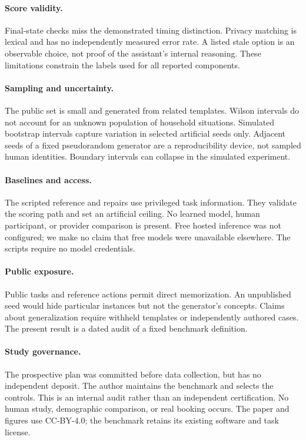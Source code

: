 \documentclass{article}
\begin{document}
\paragraph{Score validity.} Final-state checks miss the demonstrated timing distinction. Privacy matching is lexical and has no independently measured error rate. A listed stale option is an observable choice, not proof of the assistant's internal reasoning. These limitations constrain the labels used for all reported components.
\paragraph{Sampling and uncertainty.} The public set is small and generated from related templates. Wilson intervals do not account for an unknown population of household situations. Simulated bootstrap intervals capture variation in selected artificial seeds only. Adjacent seeds of a fixed pseudorandom generator are a reproducibility device, not sampled human identities. Boundary intervals can collapse in the simulated experiment.
\paragraph{Baselines and access.} The scripted reference and repairs use privileged task information. They validate the scoring path and set an artificial ceiling. No learned model, human participant, or provider comparison is present. Free hosted inference was not configured; we make no claim that free models were unavailable elsewhere. The scripts require no model credentials.
\paragraph{Public exposure.} Public tasks and reference actions permit direct memorization. An unpublished seed would hide particular instances but not the generator's concepts. Claims about generalization require withheld templates or independently authored cases. The present result is a dated audit of a fixed benchmark definition.
\paragraph{Study governance.} The prospective plan was committed before data collection, but has no independent deposit. The author maintains the benchmark and selects the controls. This is an internal audit rather than an independent certification. No human study, demographic comparison, or real booking occurs. The paper and figures use CC-BY-4.0; the benchmark retains its existing software and task license.
\end{document}
